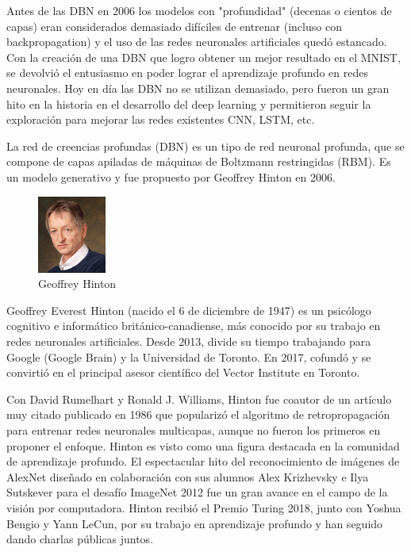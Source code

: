 \documentclass[a4paper]{article}
\begin{document}
Antes de las DBN en 2006 los modelos con "profundidad" (decenas o 
cientos de capas) eran considerados demasiado difíciles de 
entrenar (incluso con backpropagation) y el uso de las redes 
neuronales artificiales quedó estancado. Con la creación de una 
DBN que logro obtener un mejor resultado en el MNIST, se devolvió 
el entusiasmo en poder lograr el aprendizaje profundo en redes 
neuronales. Hoy en día las DBN no se utilizan demasiado, pero 
fueron un gran hito en la historia en el desarrollo del deep 
learning y permitieron seguir la exploración para mejorar las 
redes existentes CNN, LSTM, etc.

La red de creencias profundas (DBN) es un tipo de red neuronal 
profunda, que se compone de capas apiladas de máquinas de 
Boltzmann restringidas (RBM). Es un modelo generativo y fue 
propuesto por Geoffrey Hinton en 2006.

\begin{figure} %
    \centering
    \includegraphics[width=0.2\textwidth]{./images/Geoffrey_Hinton.jpeg}
    \caption{Geoffrey Hinton}
\end{figure}

Geoffrey Everest Hinton (nacido el 6 de diciembre de 1947) es un 
psicólogo cognitivo e informático británico-canadiense, más 
conocido por su trabajo en redes neuronales artificiales. Desde 
2013, divide su tiempo trabajando para Google (Google Brain) y la 
Universidad de Toronto. En 2017, cofundó y se convirtió en el 
principal asesor científico del Vector Institute en Toronto.

Con David Rumelhart y Ronald J. Williams, Hinton fue coautor de un 
artículo muy citado publicado en 1986 que popularizó el algoritmo 
de retropropagación para entrenar redes neuronales multicapas, 
aunque no fueron los primeros en proponer el enfoque. Hinton es 
visto como una figura destacada en la comunidad de aprendizaje 
profundo. El espectacular hito del reconocimiento de imágenes de 
AlexNet diseñado en colaboración con sus alumnos Alex Krizhevsky e 
Ilya Sutskever para el desafío ImageNet 2012 fue un gran avance en 
el campo de la visión por computadora.
Hinton recibió el Premio Turing 2018, junto con Yoshua Bengio y 
Yann LeCun, por su trabajo en aprendizaje profundo y han seguido 
dando charlas públicas juntos.
\end{document}
